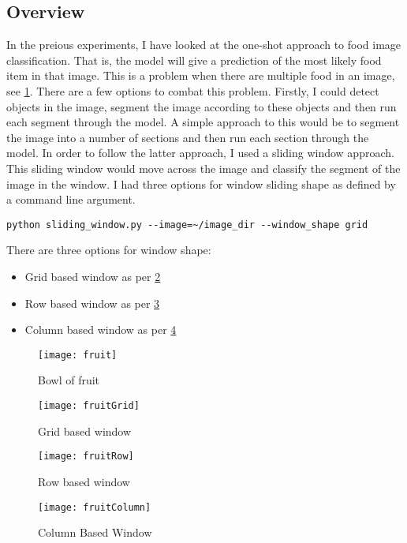 \subsection*{Overview}
In the preious experiments, I have looked at the one-shot approach to food image
classification. That is, the model will give a prediction of the most likely
food item in that image. This is a problem when there are multiple food in an
image, see \ref{fig:fruit}. There are a few options to combat this problem. Firstly, I could detect
objects in the image, segment the image according to these objects and then run
each segment through the model. A simple approach to this would be to segment
the image into a number of sections and then run each section through the model.
In order to follow the latter approach, I used a sliding window approach. This
sliding window would move across the image and classify the segment of the image
in the window. I had three options for window sliding shape as defined by a
command line argument.

\begin{lstlisting}
python sliding_window.py --image=~/image_dir --window_shape grid
\end{lstlisting}

There are three options for window shape:
\begin{itemize}
	\item{Grid based window as per \ref{fig:fruitGrid}}
	\item{Row based window as per \ref{fig:fruitRow}}
	\item{Column based window as per \ref{fig:fruitColumn}}
\end{itemize}

\begin{figure}
    \texttt{[image: fruit]}
    \caption{Bowl of fruit}
    \label{fig:fruit}
\end{figure}

\begin{figure}
    \texttt{[image: fruitGrid]}
	\caption{Grid based window}
    \label{fig:fruitGrid}
\end{figure}

\begin{figure}
    \texttt{[image: fruitRow]}
    \caption{Row based window}
    \label{fig:fruitRow}
\end{figure}

\begin{figure}
    \texttt{[image: fruitColumn]}
    \caption{Column Based Window}
    \label{fig:fruitColumn}
\end{figure}

